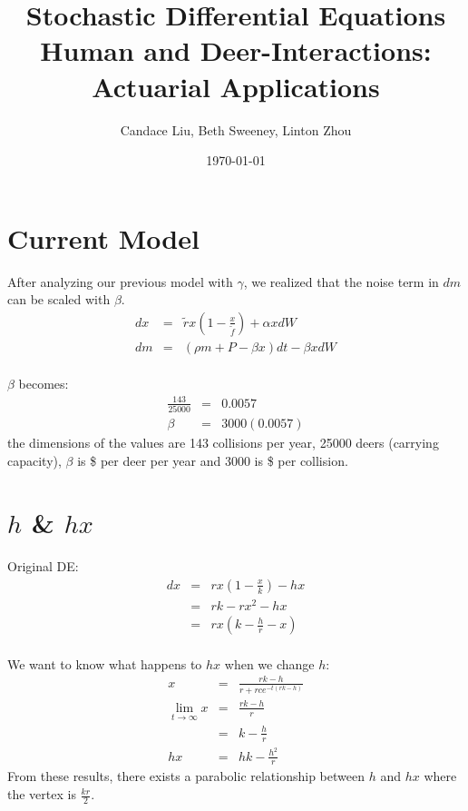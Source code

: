 \documentclass[11pt]{article}
\title{Stochastic Differential Equations \\ Human and Deer-Interactions: Actuarial Applications}
\author{Candace Liu, Beth Sweeney, Linton Zhou}
\date{\today}
\begin{document}
\maketitle

\section{Current Model}
After analyzing our previous model with $\gamma$, we realized that the noise term in $dm$ can be scaled with $\beta$. 
\begin{eqnarray*}
dx &=& \tilde{r}x \left( 1-\frac{x}{\tilde{f}} \right) + \alpha x dW \\
dm &=& (\rho m + P - \beta x) dt - \beta x dW
\end{eqnarray*}
\\

$\beta$ becomes:
\begin{eqnarray*}
	\frac{143}{25000} &=& 0.0057 \\
	\beta &=& 3000(0.0057)
\end{eqnarray*}
the dimensions of the values are  143 collisions per year, 25000 deers (carrying capacity), $\beta$ is \$ per deer per year and 3000 is \$ per collision.

\section{$h$ \& $hx$}
Original DE:
\begin{eqnarray*}
	dx &=& rx \left( 1-\frac{x}{k} \right) - hx \\
	&=& rk- rx^{2} - hx \\
	&=& rx \left( k - \frac{h}{r} - x \right)
\end{eqnarray*}
\\

We want to know what happens to $hx$ when we change $h$:
\begin{eqnarray*}
	x &=& \frac{rk-h}{r+rce^{-t(rk-h)}} \\
	\lim_{t \to \infty} x &=& \frac{rk-h}{r} \\
	& =& k- \frac{h}{r} \\
	hx &=& hk-\frac{h^{2}}{r}
\end{eqnarray*}
From these results, there exists a parabolic relationship between $h$ and $hx$ where the vertex is $\frac{kr}{2}$.

          
\end{document}
